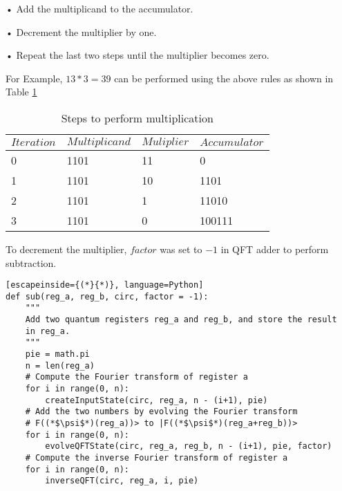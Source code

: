 \documentclass{cpp}
\begin{document}
•	Add the multiplicand to the accumulator.

•	Decrement the multiplier by one.

•	Repeat the last two steps until the multiplier becomes zero.

For Example, $13 * 3 = 39$ can be performed using the above rules as shown in Table \ref{table:table5}

\begin{table}[h]
\centering
\caption{Steps to perform multiplication}
\begin{tabular}{llll}
\hline
$Iteration$ &
$Multiplicand$ &
$Muliplier$ &
$Accumulator$ \\
\hline
0 &
1101 &
11 &
0 \\
1 &
1101 &
10 &
1101 \\
2 &
1101 &
1 &
11010 \\
3 &
1101 &
0 &
100111 \\
\hline
\end{tabular}
\label{table:table5}
\end{table}

\newpage
To decrement the multiplier, $factor$ was set to $-1$ in QFT adder to perform subtraction.

\begin{lstlisting}[escapeinside={(*}{*)}, language=Python]
def sub(reg_a, reg_b, circ, factor = -1):
    """
    Add two quantum registers reg_a and reg_b, and store the result 
    in reg_a.
    """
    pie = math.pi
    n = len(reg_a)
    # Compute the Fourier transform of register a
    for i in range(0, n):
        createInputState(circ, reg_a, n - (i+1), pie)
    # Add the two numbers by evolving the Fourier transform   
    # F((*$\psi$*)(reg_a))> to |F((*$\psi$*)(reg_a+reg_b))>
    for i in range(0, n):
        evolveQFTState(circ, reg_a, reg_b, n - (i+1), pie, factor)
    # Compute the inverse Fourier transform of register a
    for i in range(0, n):
        inverseQFT(circ, reg_a, i, pie)
\end{lstlisting}
\end{document}
